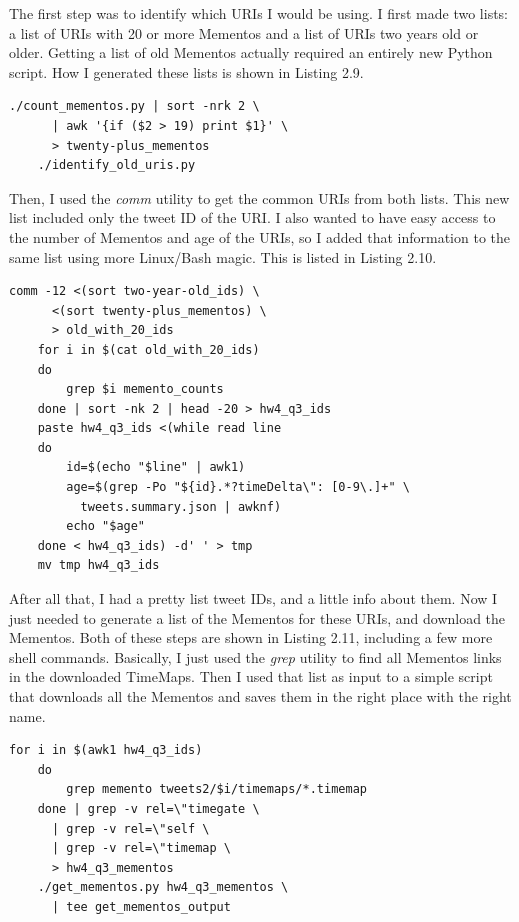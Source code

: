 \documentclass[a4paper,12pt]{article}
\begin{document}
The first step was to identify which URIs I would be using. I first made two lists: a list of URIs with
20 or more Mementos and a list of URIs two years old or older. Getting a list of old Mementos actually
required an entirely new Python script. 
How I generated these lists is shown in Listing 2.9. 

\begin{lstlisting}[basicstyle=\ttfamily,caption={Making Lists of URIs}]
    ./count_mementos.py | sort -nrk 2 \
      | awk '{if ($2 > 19) print $1}' \
      > twenty-plus_mementos
    ./identify_old_uris.py
\end{lstlisting}

Then, I used the \emph{comm} utility to get the common URIs from both lists. This new list included only the
tweet ID of the URI. I also wanted to have easy access to the number of Mementos and age of the URIs, so I
added that information to the same list using more Linux/Bash magic. This is listed in Listing 2.10.

\begin{lstlisting}[basicstyle=\ttfamily,caption={Magicing More Columns}]
    comm -12 <(sort two-year-old_ids) \
      <(sort twenty-plus_mementos) \
      > old_with_20_ids
    for i in $(cat old_with_20_ids)
    do
        grep $i memento_counts
    done | sort -nk 2 | head -20 > hw4_q3_ids
    paste hw4_q3_ids <(while read line
    do
        id=$(echo "$line" | awk1)
        age=$(grep -Po "${id}.*?timeDelta\": [0-9\.]+" \
          tweets.summary.json | awknf)
        echo "$age"
    done < hw4_q3_ids) -d' ' > tmp
    mv tmp hw4_q3_ids
\end{lstlisting}

After all that, I had a pretty list tweet IDs, and a little info about them. Now I just needed to generate
a list of the Mementos for these URIs, and download the Mementos. Both of these steps are shown in Listing
2.11, including a few more shell commands. Basically, I just used the \emph{grep} utility to find all
Mementos links in the downloaded TimeMaps. Then I used that list as input to a simple script that downloads
all the Mementos and saves them in the right place with the right name.

\begin{lstlisting}[basicstyle=\ttfamily,caption={Getting Mementos}]
    for i in $(awk1 hw4_q3_ids)
    do
        grep memento tweets2/$i/timemaps/*.timemap
    done | grep -v rel=\"timegate \
      | grep -v rel=\"self \
      | grep -v rel=\"timemap \
      > hw4_q3_mementos
    ./get_mementos.py hw4_q3_mementos \
      | tee get_mementos_output
\end{lstlisting}
\end{document}
